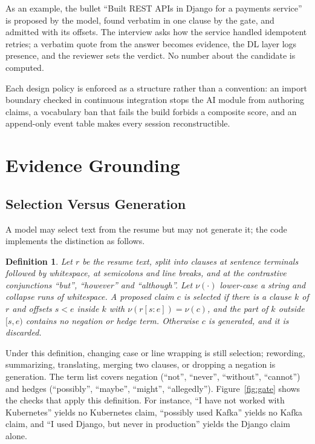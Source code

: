 \documentclass[conference,a4paper]{IEEEtran}
\newtheorem{definition}{Definition}
\begin{document}
As an example, the bullet ``Built REST APIs in Django for a payments
service'' is proposed by the model, found verbatim in one clause by the gate,
and admitted with its offsets. The interview asks how the service handled
idempotent retries; a verbatim quote from the answer becomes evidence, the DL
layer logs presence, and the reviewer sets the verdict. No number about the
candidate is computed.

Each design policy is enforced as a structure rather than a convention: an
import boundary checked in continuous integration stops the AI module from
authoring claims, a vocabulary ban that fails the build forbids a composite
score, and an append-only event table makes every session reconstructible.

\section{Evidence Grounding}
\label{sec:grounding}
\subsection{Selection Versus Generation}
A model may select text from the resume but may not generate it; the code
implements the distinction as follows.

\begin{definition}
Let $r$ be the resume text, split into clauses at sentence terminals
followed by whitespace, at semicolons and line breaks, and at the contrastive
conjunctions ``but'', ``however'' and ``although''. Let $\nu(\cdot)$ lower-case
a string and collapse runs of whitespace. A proposed claim $c$ is
\emph{selected} if there is a clause $k$ of $r$ and offsets $s<e$ inside $k$
with $\nu(r[s{:}e]) = \nu(c)$, and the part of $k$ outside $[s,e)$ contains no
negation or hedge term. Otherwise $c$ is \emph{generated}, and it is discarded.
\end{definition}

Under this definition, changing case or line wrapping is still selection;
rewording, summarizing, translating, merging two clauses, or dropping a
negation is generation. The term list covers negation (``not'', ``never'', ``without'', ``cannot'')
and hedges (``possibly'', ``maybe'', ``might'', ``allegedly'').
Figure~\ref{fig:gate} shows the checks that apply this definition. For
instance, ``I have not worked with Kubernetes'' yields no
Kubernetes claim, ``possibly used Kafka'' yields no Kafka claim, and ``I used
Django, but never in production'' yields the Django claim alone.
\end{document}
